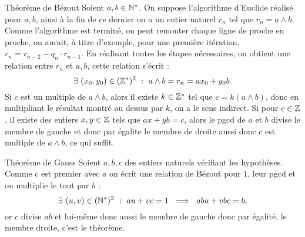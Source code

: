 \documentclass{article}
\date{4 Février 2024}
\begin{document}
	\maketitle

 \begin{question_kholle}
    [Soient $a,b\in \N ^*$ et $c\in \Z$. Il existe des entiers $x,y\in \Z$ tels que $ax + yb = c$ si et seulement si $c$ est multiple du pgcd de $a$ et $b$.]
    {Théorème de Bézout}
    Soient $a,b\in \N^*$. On suppose l'algorithme d'Euclide réalisé pour $a,b$, ainsi à la fin de ce dernier on a un entier naturel $r_n$ tel que $r_n = a\wedge b$. Comme l'algorithme est terminé, on peut remonter chaque ligne de proche en proche, on aurait, à titre d'exemple, pour une première itération, $r_n =r_{n-2} - q_{n} \cdot r_{n-1}$. En réalisant toutes les étapes nécessaires, on obtient une relation entre $r_n$ et $a,b$, cette relation s'écrit : $$\exists \ (x_0, y_0)\in (\mathbb Z ^*)^2 \ : \ a\wedge b = r_n = ax_0 + y_0b.$$
    Si $c$ est un multiple de $a\wedge b $, alors il existe $k\in \mathbb Z^*$ tel que $c = k(a\wedge b)$, donc en multipliant le résultat montré au dessus par $k$, on a le sens indirect. Si pour $c\in \Z$, il existe des entiers $x,y\in \Z$ tels que $ax + yb = c$, alors le pgcd de $a$ et $b$ divise le membre de gauche et donc par égalite le membre de droite aussi donc $c$ est multiple de $a\wedge b$, ce qui suffit. 
\end{question_kholle}
\begin{question_kholle}
    {Théorème de Gauss}
    Soient $a,b,c$ des entiers naturels vérifiant les hypothèses. \\
    Comme $c$ est premier avec $a$ on écrit une relation de Bézout pour $1$, leur pgcd et on multiplie le tout par $b$ : 
    $$\exists \ (u,v) \in (\mathbb N ^*)^2 \ : \ au + vc = 1 \ \implies \ abu + vbc = b, $$
    or $c$ divise $ab$ et lui-même donc aussi le membre de gauche donc par égalité, le membre droite, c'est le théorème.
\end{question_kholle}
\end{document}
